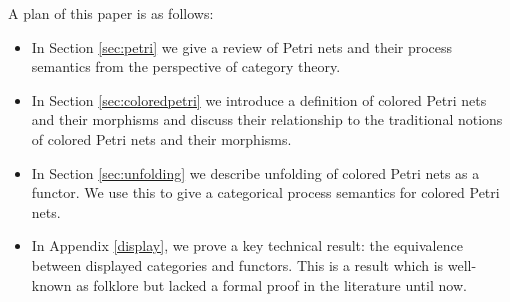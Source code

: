A plan of this paper is as follows: 
\begin{itemize}
    \item In Section \ref{sec:petri} we give a review of Petri nets and their process semantics from the perspective of category theory.
    \item In Section \ref{sec:coloredpetri} we introduce a definition of colored Petri nets and their morphisms and discuss their relationship to the traditional notions of colored Petri nets and their morphisms.
   \item In Section \ref{sec:unfolding} we describe unfolding of colored Petri nets as a functor. We use this to give a categorical process semantics for colored Petri nets.
   \item In Appendix \ref{display}, we prove a key technical result: the equivalence between displayed categories and functors. This is a result which is well-known as folklore but lacked a formal proof in the literature until now.
\end{itemize}
